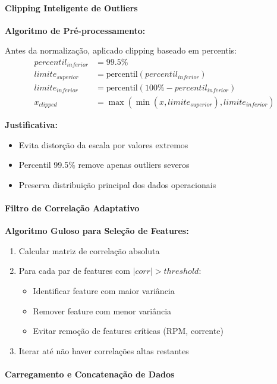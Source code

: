 \paragraph{Clipping Inteligente de Outliers}

\textbf{Algoritmo de Pré-processamento:}

Antes da normalização, aplicado clipping baseado em percentis:
\begin{align}
percentil_{inferior} &= 99.5\% \\
limite_{superior} &= \text{percentil}(percentil_{inferior}) \\
limite_{inferior} &= \text{percentil}(100\% - percentil_{inferior}) \\
x_{clipped} &= \max(\min(x, limite_{superior}), limite_{inferior})
\end{align}

\textbf{Justificativa:}
\begin{itemize}
    \item Evita distorção da escala por valores extremos
    \item Percentil 99.5\% remove apenas outliers severos
    \item Preserva distribuição principal dos dados operacionais
\end{itemize}

\paragraph{Filtro de Correlação Adaptativo}

\textbf{Algoritmo Guloso para Seleção de Features:}

\begin{enumerate}
    \item Calcular matriz de correlação absoluta
    \item Para cada par de features com $|corr| > threshold$:
    \begin{itemize}
        \item Identificar feature com maior variância
        \item Remover feature com menor variância
        \item Evitar remoção de features críticas (RPM, corrente)
    \end{itemize}
    \item Iterar até não haver correlações altas restantes
\end{enumerate}

\paragraph{Carregamento e Concatenação de Dados}

